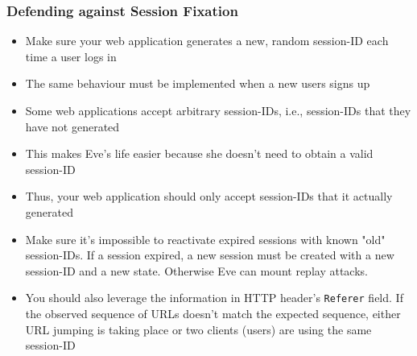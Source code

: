 \begin{frame}
    \frametitle{Defending against Session Fixation}
    \begin{itemize}
        \item Make sure your web application generates a new, random session-ID each time a user logs in
        \item The same behaviour must be implemented when a new users signs up
        \item Some web applications accept arbitrary session-IDs, i.e., session-IDs that they have not generated
        \item This makes Eve's life easier because she doesn't need to obtain a valid session-ID
        \item Thus, your web application should only accept session-IDs that it actually generated 
        \item Make sure it's impossible to reactivate expired sessions with known "old" session-IDs. If a session expired, a new session must be created with a new session-ID and a new state. Otherwise Eve can mount replay attacks.
        \item You should also leverage the information in HTTP header's \texttt{Referer} field. If the observed sequence of URLs doesn't match the expected sequence, either URL jumping is taking place or two clients (users) are using the same session-ID
    \end{itemize}
\end{frame}




